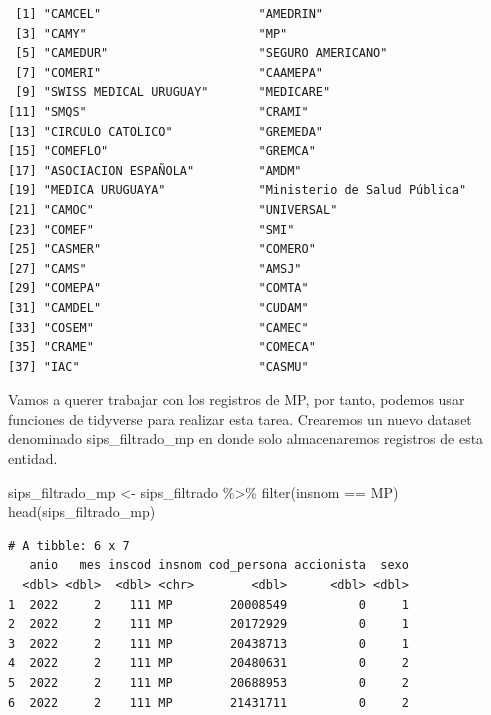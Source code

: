 \documentclass[
  letterpaper,
  DIV=11,
  numbers=noendperiod]{scrreprt}
\newenvironment{Shaded}{\begin{snugshade}}{\end{snugshade}}
\newcommand{\FunctionTok}[1]{\textcolor[rgb]{0.28,0.35,0.67}{#1}}
\newcommand{\NormalTok}[1]{\textcolor[rgb]{0.00,0.23,0.31}{#1}}
\newcommand{\OtherTok}[1]{\textcolor[rgb]{0.00,0.23,0.31}{#1}}
\newcommand{\SpecialCharTok}[1]{\textcolor[rgb]{0.37,0.37,0.37}{#1}}
\newcommand{\StringTok}[1]{\textcolor[rgb]{0.13,0.47,0.30}{#1}}
\begin{document}
\begin{verbatim}
 [1] "CAMCEL"                      "AMEDRIN"                    
 [3] "CAMY"                        "MP"                         
 [5] "CAMEDUR"                     "SEGURO AMERICANO"           
 [7] "COMERI"                      "CAAMEPA"                    
 [9] "SWISS MEDICAL URUGUAY"       "MEDICARE"                   
[11] "SMQS"                        "CRAMI"                      
[13] "CIRCULO CATOLICO"            "GREMEDA"                    
[15] "COMEFLO"                     "GREMCA"                     
[17] "ASOCIACION ESPAÑOLA"         "AMDM"                       
[19] "MEDICA URUGUAYA"             "Ministerio de Salud Pública"
[21] "CAMOC"                       "UNIVERSAL"                  
[23] "COMEF"                       "SMI"                        
[25] "CASMER"                      "COMERO"                     
[27] "CAMS"                        "AMSJ"                       
[29] "COMEPA"                      "COMTA"                      
[31] "CAMDEL"                      "CUDAM"                      
[33] "COSEM"                       "CAMEC"                      
[35] "CRAME"                       "COMECA"                     
[37] "IAC"                         "CASMU"                      
\end{verbatim}

Vamos a querer trabajar con los registros de MP, por tanto, podemos usar
funciones de tidyverse para realizar esta tarea. Crearemos un nuevo
dataset denominado sips\_filtrado\_mp en donde solo almacenaremos
registros de esta entidad.

\begin{Shaded}
\begin{Highlighting}[]
\NormalTok{sips\_filtrado\_mp }\OtherTok{\textless{}{-}}\NormalTok{ sips\_filtrado }\SpecialCharTok{\%\textgreater{}\%} 
  \FunctionTok{filter}\NormalTok{(insnom }\SpecialCharTok{==} \StringTok{\textquotesingle{}MP\textquotesingle{}}\NormalTok{)}
\FunctionTok{head}\NormalTok{(sips\_filtrado\_mp)}
\end{Highlighting}
\end{Shaded}

\begin{verbatim}
# A tibble: 6 x 7
   anio   mes inscod insnom cod_persona accionista  sexo
  <dbl> <dbl>  <dbl> <chr>        <dbl>      <dbl> <dbl>
1  2022     2    111 MP        20008549          0     1
2  2022     2    111 MP        20172929          0     1
3  2022     2    111 MP        20438713          0     1
4  2022     2    111 MP        20480631          0     2
5  2022     2    111 MP        20688953          0     2
6  2022     2    111 MP        21431711          0     2
\end{verbatim}
\end{document}

